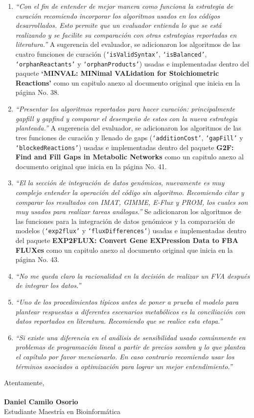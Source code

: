 \documentclass[11pt,a4paper]{article}
\begin{document}
\begin{enumerate}
\item \emph{``Con el fin de entender de mejor manera como funciona la estrategia de curación recomiendo incorporar los algoritmos usados en los códigos desarrollados. Esto permite que un evaluador entienda lo que se está realizando y se facilite su comparación con otras estrategias reportadas en literatura.''} A sugerencia del evaluador, se adicionaron los algoritmos de las cuatro funciones de curación  (\texttt{`isValidSyntax'}, \texttt{`isBalanced'}, \texttt{`orphanReactants'} y \texttt{`orphanProducts'}) usadas e implementadas dentro del paquete \textbf{`MINVAL: MINimal VALidation for Stoichiometric Reactions'} como un capitulo anexo al documento original que inicia en la página No. 38.
\item \emph{``Presentar los algoritmos reportados para hacer curación: principalmente gapfill y gapfind y comparar el desempeño de estos con la nueva estrategia planteada.''} A sugerencia del evaluador, se adicionaron los algoritmos de las tres funciones de curación y llenado de gaps  (\texttt{`additionCost'}, \texttt{`gapFill'} y \texttt{`blockedReactions'}) usadas e implementadas dentro del paquete \textbf{G2F: Find and Fill Gaps in Metabolic Networks} como un capitulo anexo al documento original que inicia en la página No. 41.
\item \emph{``El la sección de integración de datos genómicos, nuevamente es muy complejo entender la operación del código sin algoritmo. Recomiendo citar y comparar los resultados con IMAT, GIMME, E-Flux y PROM, los cuales son muy usados para realizar tareas análogas.''} Se adicionaron los algoritmos de las funciones para la integración de datos genómicos y la comparación de modelos  (\texttt{`exp2flux'} y \texttt{`fluxDifferences'}) usadas e implementadas dentro del paquete \textbf{EXP2FLUX: Convert Gene EXPression Data to FBA FLUXes} como un capitulo anexo al documento original que inicia en la página No. 43.
\item \emph{``No me queda claro la racionalidad en la decisión de realizar un FVA después de integrar los datos.''}
\item \emph{``Uno de los procedimientos típicos antes de poner a prueba el modelo para plantear respuestas a diferentes escenarios metabólicos es la conciliación con datos reportados en literatura. Recomiendo que se realice esta etapa.''}
\item \emph{``Si existe una diferencia en el análisis de sensibilidad usado comúnmente en problemas de programación lineal a partir de precios sombra y lo que plantea el capítulo por favor mencionarlo. En caso contrario recomiendo usar los términos asociados a optimización para lograr un mejor entendimiento.''}
\end{enumerate}
Atentamente,\\
\\
\textbf{Daniel Camilo Osorio}\\
Estudiante Maestría en Bioinformática
\end{document}
